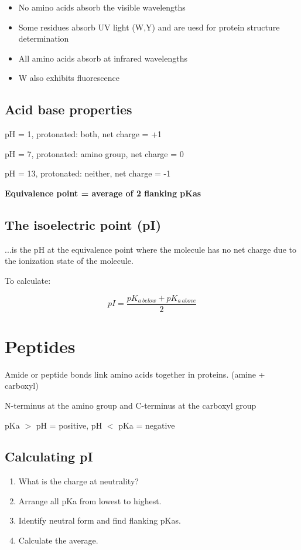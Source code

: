 \documentclass[letterpaper, 12pt]{article}
\begin{document}
\begin{itemize}
\item No amino acids absorb the visible wavelengths
\item Some residues absorb UV light (W,Y) and are uesd for protein structure determination
\item All amino acids absorb at infrared wavelengths
\item W also exhibits fluorescence
\end{itemize}

\subsection*{Acid base properties}

pH = 1, protonated: both, net charge = +1

pH = 7, protonated: amino group, net charge = 0

pH = 13, protonated: neither, net charge = -1

\textbf{Equivalence point = average of 2 flanking pKas}

\subsection*{The isoelectric point (pI)}
...is the pH at the equivalence point where the molecule has no net charge due to the ionization state of the molecule.

To calculate:

\begin{equation}
pI = \frac{pK_{a \: below} + pK_{a \: above}}{2}
\end{equation}

\newpage

\section*{Peptides}

Amide or peptide bonds link amino acids together in proteins. (amine + carboxyl)

N-terminus at the amino group and C-terminus at the carboxyl group

pKa $>$ pH = positive, pH $<$ pKa = negative

\subsection*{Calculating pI}

\begin{enumerate}
\item What is the charge at neutrality?
\item Arrange all pKa from lowest to highest.
\item Identify neutral form and find flanking pKas.
\item Calculate the average.
\end{enumerate}
\end{document}
